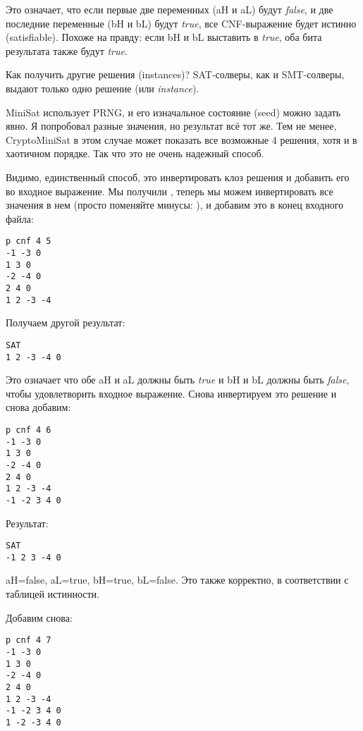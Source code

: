 Это означает, что если первые две переменных (aH и aL) будут \textit{false},
и две последние переменные (bH и bL) будут \textit{true},
все \ac{CNF}-выражение будет истинно (satisfiable).
Похоже на правду: если bH и bL выставить в \textit{true}, оба бита результата также будут \textit{true}.

Как получить другие решения (instances)?
\ac{SAT}-солверы, как и \ac{SMT}-солверы, выдают только одно решение (или \textit{instance}).

MiniSat использует \ac{PRNG}, и его изначальное состояние (seed) можно задать явно.
Я попробовал разные значения, но результат всё тот же.
Тем не менее, CryptoMiniSat в этом случае может показать все возможные 4 решения, хотя и в хаотичном порядке.
Так что это не очень надежный способ.

Видимо, единственный способ, это инвертировать клоз решения и добавить его во входное выражение.
Мы получили , 
теперь мы можем инвертировать все значения в нем (просто поменяйте минусы: ),
и добавим это в конец входного файла:

\begin{lstlisting}
p cnf 4 5
-1 -3 0
1 3 0
-2 -4 0
2 4 0
1 2 -3 -4
\end{lstlisting}

Получаем другой результат:

\begin{lstlisting}
SAT
1 2 -3 -4 0
\end{lstlisting}

Это означает что обе aH и aL должны быть \textit{true} и bH и bL должны быть \textit{false}, чтобы удовлетворить
входное выражение.
Снова инвертируем это решение и снова добавим:

\begin{lstlisting}
p cnf 4 6
-1 -3 0
1 3 0
-2 -4 0
2 4 0
1 2 -3 -4
-1 -2 3 4 0
\end{lstlisting}

Результат:

\begin{lstlisting}
SAT
-1 2 3 -4 0
\end{lstlisting}

aH=false, aL=true, bH=true, bL=false. Это также корректно, в соответствии с таблицей истинности.

Добавим снова:

\begin{lstlisting}
p cnf 4 7
-1 -3 0
1 3 0
-2 -4 0
2 4 0
1 2 -3 -4
-1 -2 3 4 0
1 -2 -3 4 0
\end{lstlisting}

